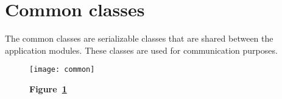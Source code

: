 	\section{Common classes}\label{sec:common}
	The common classes are serializable classes that are shared between the
	application modules. These classes are used for communication purposes.


	\begin{figure}[!h]
		\texttt{[image: common]}
		\caption*{\textbf{Figure~\ref{fig:common}}}
		\captionlistentry{}
		\label{fig:common}
	\end{figure}
